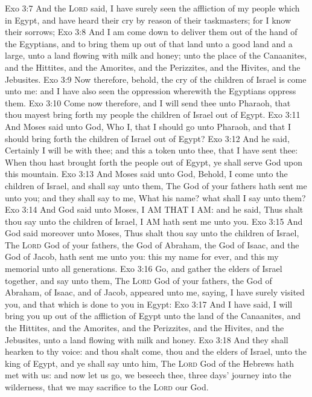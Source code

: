 \vs Exo 3:7 And the \textsc{Lord} said, I have surely seen the affliction of my people which  in Egypt, and have heard their cry by reason of their taskmasters; for I know their sorrows;
\vs Exo 3:8 And I am come down to deliver them out of the hand of the Egyptians, and to bring them up out of that land unto a good land and a large, unto a land flowing with milk and honey; unto the place of the Canaanites, and the Hittites, and the Amorites, and the Perizzites, and the Hivites, and the Jebusites.
\vs Exo 3:9 Now therefore, behold, the cry of the children of Israel is come unto me: and I have also seen the oppression wherewith the Egyptians oppress them.
\vs Exo 3:10 Come now therefore, and I will send thee unto Pharaoh, that thou mayest bring forth my people the children of Israel out of Egypt.
\vs Exo 3:11 And Moses said unto God, Who  I, that I should go unto Pharaoh, and that I should bring forth the children of Israel out of Egypt?
\vs Exo 3:12 And he said, Certainly I will be with thee; and this  a token unto thee, that I have sent thee: When thou hast brought forth the people out of Egypt, ye shall serve God upon this mountain.
\vs Exo 3:13 And Moses said unto God, Behold,  I come unto the children of Israel, and shall say unto them, The God of your fathers hath sent me unto you; and they shall say to me, What  his name? what shall I say unto them?
\vs Exo 3:14 And God said unto Moses, I AM THAT I AM: and he said, Thus shalt thou say unto the children of Israel, I AM hath sent me unto you.
\vs Exo 3:15 And God said moreover unto Moses, Thus shalt thou say unto the children of Israel, The \textsc{Lord} God of your fathers, the God of Abraham, the God of Isaac, and the God of Jacob, hath sent me unto you: this  my name for ever, and this  my memorial unto all generations.
\vs Exo 3:16 Go, and gather the elders of Israel together, and say unto them, The \textsc{Lord} God of your fathers, the God of Abraham, of Isaac, and of Jacob, appeared unto me, saying, I have surely visited you, and  that which is done to you in Egypt:
\vs Exo 3:17 And I have said, I will bring you up out of the affliction of Egypt unto the land of the Canaanites, and the Hittites, and the Amorites, and the Perizzites, and the Hivites, and the Jebusites, unto a land flowing with milk and honey.
\vs Exo 3:18 And they shall hearken to thy voice: and thou shalt come, thou and the elders of Israel, unto the king of Egypt, and ye shall say unto him, The \textsc{Lord} God of the Hebrews hath met with us: and now let us go, we beseech thee, three days' journey into the wilderness, that we may sacrifice to the \textsc{Lord} our God.
